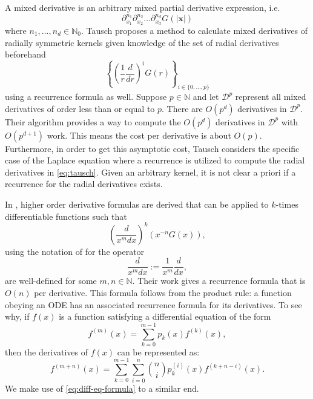 \documentclass[12pt]{article}
\def\N{{\mathbb N}}
\let\b=\boldsymbol
\theoremstyle{definition}
\theoremstyle{plain}
\theoremstyle{definition}
\begin{document}
A mixed derivative is an arbitrary mixed partial derivative expression, i.e.
\[
\partial^{n_1}_{x_1} \partial^{n_2}_{x_2} \dots \partial^{n_d}_{x_d} G(|\b{x}|)
\] where $n_1, \dots, n_d \in \N_{0}$. Tausch \cite{tausch2003fast} proposes a method to calculate mixed derivatives of radially symmetric kernels given knowledge of the set of radial derivatives beforehand
\begin{equation}
\label{eq:tausch}
\left\{\left( \frac{1}{r} \frac{d}{dr} \right)^i G(r) \right\}_{i \in\{0, \dots, p\}}
\end{equation}
using a recurrence formula as well. Suppose $p \in \N$ and let $\mathcal{D}^p$ represent all mixed derivatives of order less than or equal to $p$. There are $O(p^{d})$ derivatives in $\mathcal{D}^p$. Their algorithm provides a way to compute the $O(p^d)$ derivatives in $\mathcal{D}^p$ with $O(p^{d+1})$ work. This means the cost per derivative is about $O(p)$. Furthermore, in order to get this asymptotic cost, Tausch considers the specific case of the Laplace equation where a recurrence is utilized to compute the radial derivatives in \eqref{eq:tausch}. Given an arbitrary kernel, it is not clear a priori if a recurrence for the radial derivatives exists.

In \cite{slevinsky2011new}, higher order derivative formulas are derived that can be applied to $k$-times differentiable functions such that
\[
\left( \frac{d}{x^m dx} \right)^k (x^{-n} G(x)),
\]
using the notation of \cite{slevinsky2011new} for the operator
\[\frac{d}{x^m dx} := \frac{1}{x^m}\frac{d}{dx},\]
are well-defined for some $m, n \in \N$. Their work gives a recurrence formula that is $O(n)$ per derivative. This formula follows from the product rule: a function obeying an ODE has an associated recurrence formula for its derivatives. To see why, if $f(x)$ is a function satisfying a differential equation of the form
\[
f^{(m)}(x) = \sum_{k=0}^{m-1} p_k(x) f^{(k)}(x),
\]
then the derivatives of $f(x)$ can be represented as:
\begin{equation}
\label{eq:diff-eq-formula}
f^{(m+n)}(x) = \sum_{k=0}^{m-1} \sum_{i=0}^n \binom{n}{i} p_k^{(i)}(x) f^{(k+n-i)}(x).
\end{equation}
We make use of \eqref{eq:diff-eq-formula} to a similar end.
\end{document}

